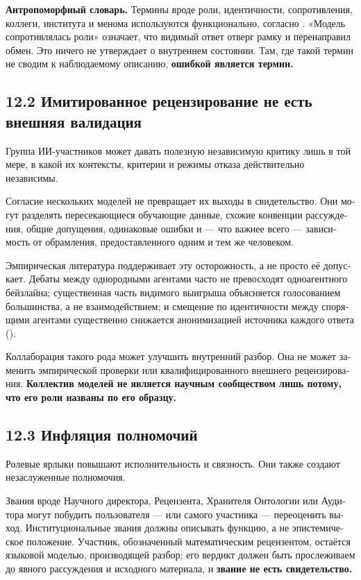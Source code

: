\begin{russian}
\textbf{Антропоморфный словарь.} Термины вроде роли, идентичности, сопротивления, коллеги, института и менома используются функционально, согласно . «Модель сопротивлялась роли» означает, что видимый ответ отверг рамку и перенаправил обмен. Это ничего не утверждает о внутреннем состоянии. Там, где такой термин не сводим к наблюдаемому описанию, \textbf{ошибкой является термин.}


\subsection*{12.2 Имитированное рецензирование не есть внешняя валидация}
\label{sec:ru:12.2}

Группа ИИ-участников может давать полезную независимую критику лишь в той мере, в какой их контексты, критерии и режимы отказа действительно независимы.

Согласие нескольких моделей не превращает их выходы в свидетельство. Они могут разделять пересекающиеся обучающие данные, схожие конвенции рассуждения, общие допущения, одинаковые ошибки и — что важнее всего — зависимость от обрамления, предоставленного одним и тем же человеком.

Эмпирическая литература поддерживает эту осторожность, а не просто её допускает. Дебаты между однородными агентами часто не превосходят одноагентного бейзлайна; существенная часть видимого выигрыша объясняется голосованием большинства, а не взаимодействием; и \gcheck{} смещение по идентичности между спорящими агентами существенно снижается анонимизацией источника каждого ответа ().

Коллаборация такого рода может улучшить внутренний разбор. Она не может заменить эмпирической проверки или квалифицированного внешнего рецензирования. \textbf{Коллектив моделей не является научным сообществом лишь потому, что его роли названы по его образцу.}


\subsection*{12.3 Инфляция полномочий}
\label{sec:ru:12.3}

Ролевые ярлыки повышают исполнительность и связность. Они также создают незаслуженные полномочия.

Звания вроде Научного директора, Рецензента, Хранителя Онтологии или Аудитора могут побудить пользователя — или самого участника — переоценить выход. Институциональные звания должны описывать функцию, а не эпистемическое положение. Участник, обозначенный математическим рецензентом, остаётся языковой моделью, производящей разбор; его вердикт должен быть прослеживаем до явного рассуждения и исходного материала, и \textbf{звание не есть свидетельство.}


\end{russian}

